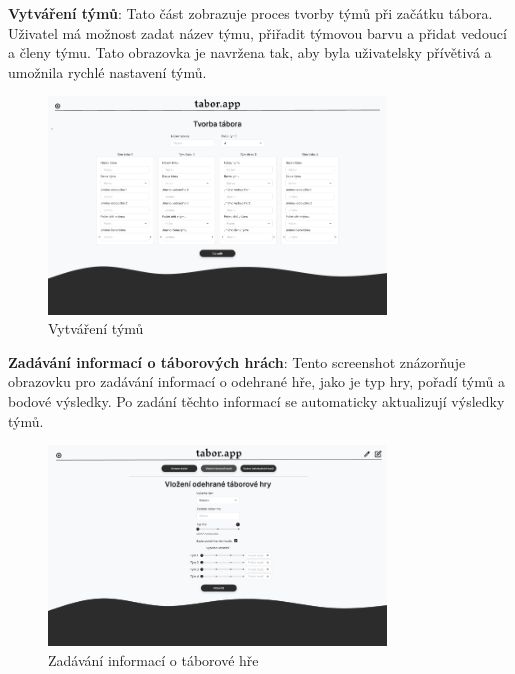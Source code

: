 \documentclass[a4paper, 12pt]{article} %
\begin{document}
\textbf{Vytváření týmů}: Tato část zobrazuje proces tvorby týmů při začátku tábora. 
Uživatel má možnost zadat název týmu, přiřadit týmovou barvu a přidat vedoucí a členy týmu. 
Tato obrazovka je navržena tak, aby byla uživatelsky přívětivá a umožnila rychlé nastavení týmů.
\begin{figure}[h!]
    \centering
    \includegraphics[width=0.8\textwidth]{./pictures/picture2.png}
    \caption{Vytváření týmů}
\end{figure}

\textbf{Zadávání informací o táborových hrách}: Tento screenshot znázorňuje obrazovku pro 
zadávání informací o odehrané hře, jako je typ hry, pořadí týmů a bodové výsledky. Po zadání 
těchto informací se automaticky aktualizují výsledky týmů.
\begin{figure}[h!]
    \centering
    \includegraphics[width=0.8\textwidth]{./pictures/picture3.png}
    \caption{Zadávání informací o táborové hře}
\end{figure}

\newpage
\end{document}
